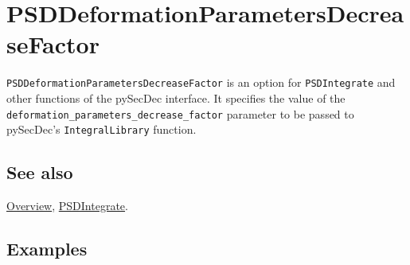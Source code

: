\documentclass[../FeynHelpersManual.tex]{subfiles}
\begin{document}
\hypertarget{psddeformationparametersdecreasefactor}{
\section{PSDDeformationParametersDecreaseFactor}\label{psddeformationparametersdecreasefactor}}

\texttt{PSDDeformationParametersDecreaseFactor} is an option for
\texttt{PSDIntegrate} and other functions of the pySecDec interface. It
specifies the value of the
\texttt{deformation_parameters_decrease_factor} parameter to be passed
to pySecDec's \texttt{IntegralLibrary} function.

\subsection{See also}

\hyperlink{toc}{Overview}, \hyperlink{psdintegrate}{PSDIntegrate}.

\subsection{Examples}
\end{document}

